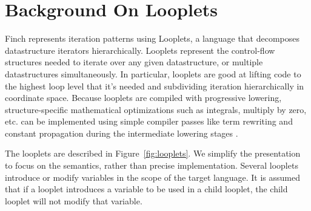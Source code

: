 \section{Background On Looplets}
Finch represents iteration patterns using Looplets, a language that decomposes datastructure iterators hierarchically. 
%
Looplets represent the control-flow structures needed to iterate over any given datastructure, or multiple datastructures simultaneously. 
%
In particular, looplets are good at lifting code to the highest loop level that it's needed and subdividing iteration hierarchically in coordinate space.
%
Because looplets are compiled with progressive lowering, structure-specific mathematical optimizations such as integrals, multiply by zero, etc. can be implemented using simple compiler passes like term rewriting and constant propagation during the intermediate lowering stages \cite{ahrens_looplets_2023}.

The looplets are described in Figure~\ref{fig:looplets}. We simplify the presentation to focus on the semantics, rather than precise implementation.  Several looplets introduce or modify variables in the scope of the target language. It is assumed that if a looplet introduces a variable to be used in a child looplet, the child looplet will not modify that variable.



